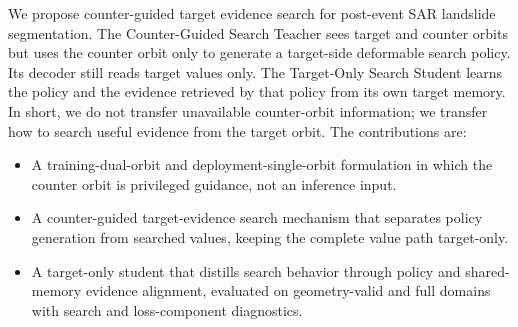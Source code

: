 We propose counter-guided target evidence search for post-event SAR landslide segmentation. The Counter-Guided Search Teacher sees target and counter orbits but uses the counter orbit only to generate a target-side deformable search policy. Its decoder still reads target values only. The Target-Only Search Student learns the policy and the evidence retrieved by that policy from its own target memory. In short, we do not transfer unavailable counter-orbit information; we transfer how to search useful evidence from the target orbit. The contributions are:

\begin{itemize}
    \item A training-dual-orbit and deployment-single-orbit formulation in which the counter orbit is privileged guidance, not an inference input.
    \item A counter-guided target-evidence search mechanism that separates policy generation from searched values, keeping the complete value path target-only.
    \item A target-only student that distills search behavior through policy and shared-memory evidence alignment, evaluated on geometry-valid and full domains with search and loss-component diagnostics.
\end{itemize}
